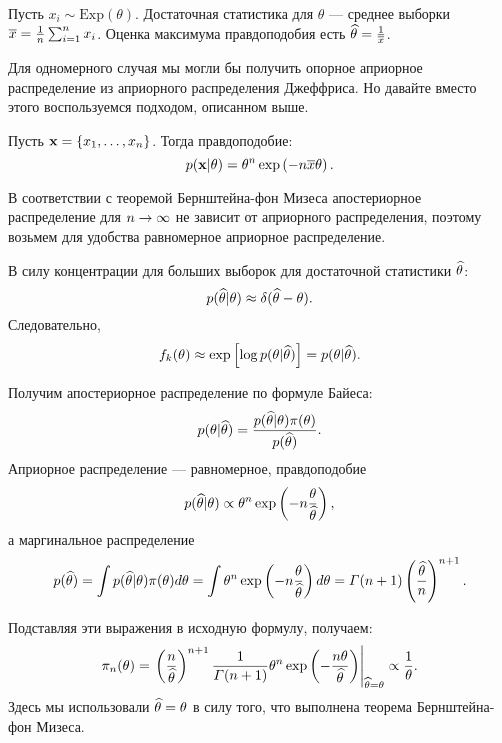 \begin{example}
Пусть $x_i \sim \mathrm{Exp}(\theta)$.
Достаточная статистика для $\theta$ --- среднее выборки $\overline{x} = \frac{1}{n} \sum_{i = 1}^n x_i$.
Оценка максимума правдоподобия есть $\widehat{\theta} = \frac{1}{\overline{x}}$.

Для одномерного случая мы могли бы получить опорное априорное распределение из априорного распределения Джеффриса.
Но давайте вместо этого воспользуемся подходом, описанном выше.

Пусть $\mathbf{x} = \{x_1, \ldots, x_n \}$. Тогда правдоподобие:
\[
p(\mathbf{x} | \theta) = \theta^{n} \exp \left(-n \overline{x} \theta\right).
\]

В соответствии с теоремой Бернштейна-фон Мизеса апостериорное распределение для $n \rightarrow \infty$ не зависит от априорного распределения, поэтому возьмем для удобства равномерное априорное распределение.

В силу концентрации для больших выборок для достаточной статистики $\widehat{\theta}$:
\[
p(\widehat{\theta} | \theta) \approx \delta(\widehat{\theta} - \theta).
\]
Следовательно,
\[
f_k(\theta) \approx \exp \left[\log p(\theta | \widehat{\theta}) \right] = p(\theta | \widehat{\theta}).
\]

Получим апостериорное распределение по формуле Байеса:
\[
p(\theta | \widehat{\theta}) = \frac{p( \widehat{\theta} | \theta) \pi(\theta)}{p(\widehat{\theta})}.
\]
Априорное распределение --- равномерное, правдоподобие 
\[
p(\widehat{\theta} | \theta) \propto \theta^{n} \exp \left(-n \frac{\theta}{\widehat{\theta}} \right),
\]
а маргинальное распределение 
\[
p(\widehat{\theta}) = \int p(\widehat{\theta} | \theta) \pi(\theta) d\theta = \int \theta^n \exp \left(-n \frac{\theta}{\widehat{\theta}} \right) d\theta = \varGamma(n + 1) \left(\frac{\widehat{\theta}}{n} \right)^{n + 1}.
\]

Подставляя эти выражения в исходную формулу, получаем:
\[
\pi_n(\theta) = \left. \left(\frac{n}{\widehat{\theta}}\right)^{n + 1} \frac{1}{\varGamma(n + 1)} \theta^n \exp \left(- \frac{n \theta}{\widehat{\theta}} \right) \right|_{\widehat{\theta} = \theta} \propto \frac{1}{\theta}.
\]
Здесь мы использовали $\widehat{\theta} = \theta$ в силу того, что выполнена теорема Бернштейна-фон Мизеса.
\end{example}

